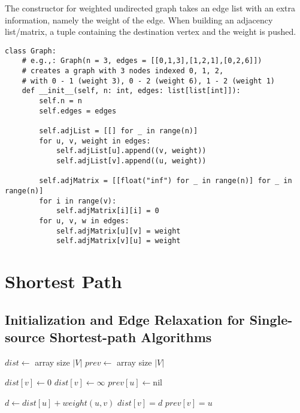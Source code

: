 
\noindent The constructor for weighted undirected graph takes an edge list with an extra information, namely the weight of the edge.
When building an adjacency list/matrix, a tuple containing the destination vertex and the weight is pushed.

\begin{verbatim}
class Graph:
    # e.g.,: Graph(n = 3, edges = [[0,1,3],[1,2,1],[0,2,6]])
    # creates a graph with 3 nodes indexed 0, 1, 2,
    # with 0 - 1 (weight 3), 0 - 2 (weight 6), 1 - 2 (weight 1)
    def __init__(self, n: int, edges: list[list[int]]):
        self.n = n
        self.edges = edges

        self.adjList = [[] for _ in range(n)]
        for u, v, weight in edges:
            self.adjList[u].append((v, weight))
            self.adjList[v].append((u, weight))

        self.adjMatrix = [[float("inf") for _ in range(n)] for _ in range(n)]
        for i in range(v):
            self.adjMatrix[i][i] = 0
        for u, v, w in edges:
            self.adjMatrix[u][v] = weight
            self.adjMatrix[v][u] = weight
\end{verbatim}

\section{Shortest Path}

\subsection{Initialization and Edge Relaxation for Single-source Shortest-path Algorithms}

\noindent \hrulefill
\begin{algorithmic}[1]
   
    \State $dist \gets$ array size $|V|$
    \State $prev \gets$ array size $|V|$

        $dist[v] \gets 0$
      \EndIf
        $dist[v] \gets \infty$
      \EndIf
      \State $prev[u] \gets \text{nil}$ 
    \EndFor
  \EndFunction
\end{algorithmic}
\noindent \hrulefill

\noindent \hrulefill
\begin{algorithmic}[1]
    \State $d \gets dist[u] + weight(u, v)$
      \State $dist[v] = d$
      \State $prev[v] = u$
    \EndIf
  \EndFunction
\end{algorithmic}
\noindent \hrulefill

